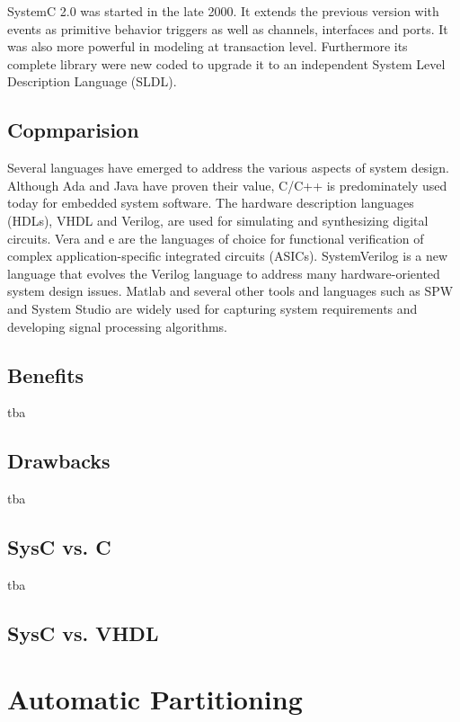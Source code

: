\documentclass{article}
\begin{document}
	    SystemC 2.0 was started in the late 2000. It extends the previous version with events as primitive behavior triggers as well as channels, interfaces and ports.
	    It was also more powerful in modeling at transaction level.
	    Furthermore its complete library were new coded to upgrade it to an independent System Level Description Language (SLDL).
		\subsection{Copmparision}
		Several languages have emerged to address the various aspects of system design. Although Ada and Java have proven their value, C/C++ is predominately used today for embedded system software. The hardware description languages (HDLs), VHDL and Verilog, are used for simulating and synthesizing digital circuits. Vera and e are the languages of choice for functional verification of complex application-specific integrated circuits (ASICs). SystemVerilog is a new language that evolves the Verilog language to address many hardware-oriented system design issues. Matlab and several other tools and languages such as SPW and System Studio are widely used for capturing system requirements and developing signal processing algorithms.
	  \subsection{Benefits}
	  tba
	  \subsection{Drawbacks}
	  tba
	  \subsection{SysC vs. C}
	  tba
	  \subsection{SysC vs. VHDL}

	\section{Automatic Partitioning}
\end{document}
